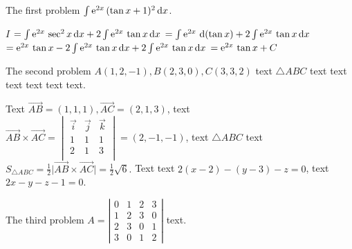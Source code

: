 \documentclass[12pt,most]{randexam}
\begin{document}
\bigskip

\newpage


\begin{problem}
The first problem $\int\mathrm{e}^{2x}\,(\tan x+1)^2\mathop{}\!\mathrm{d} x$.
\end{problem}

\smallskip

\begin{solution}
$I$ \? $=\int\mathrm{e}^{2x}\,\sec^2 x\mathop{}\!\mathrm{d} x+2\int\mathrm{e}^{2x}\,\tan x\mathop{}\!\mathrm{d} x$ 
\+ $=\int\e^{2x}\,\d(\tan x)+ 2\int\e^{2x}\,\tan x\dx$ 
\+ $=\mathrm{e}^{2x}\,\tan x - 2\int\mathrm{e}^{2x}\,\tan x\mathop{}\!\mathrm{d} x+ 2\int\mathrm{e}^{2x}\,\tan x\mathop{}\!\mathrm{d} x$ 
\+ $=\mathrm{e}^{2x}\,\tan x + C$ 
\end{solution}

\vfill

\begin{problem}
The second problem $A(1,2,-1), B(2,3,0),C(3,3,2)$ text $\triangle ABC$ text text text text text text.
\end{problem}

\smallskip

\begin{solution}
Text $\overrightarrow{AB}=(1,1,1),\overrightarrow{AC}=(2,1,3)$, 
text $\overrightarrow{AB}\times \overrightarrow{AC}=\begin{vmatrix}
\vec{i}&\vec{j} &\vec{k}\\
1&1&1\\
2&1&3\\
\end{vmatrix}=(2,-1,-1)$, 
text $\triangle ABC$ text $S_{\triangle ABC}=\frac{1}{2}\big|\overrightarrow{AB}\times
\overrightarrow{AC}\big|=\frac{1}{2}\sqrt{6}.$ 
Text text $2(x-2)-(y-3)-z=0$, text $2x-y-z-1=0$. 
\end{solution}

\vfill

\newpage

\begin{problem}
The third problem $A = \left|\begin{array}{cccc}
  0 & 1 & 2 & 3\\
  1 & 2 & 3 & 0\\
  2 & 3 & 0 & 1\\
  3 & 0 & 1 & 2
\end{array}\right|$ text.
\end{problem}
\end{document}
